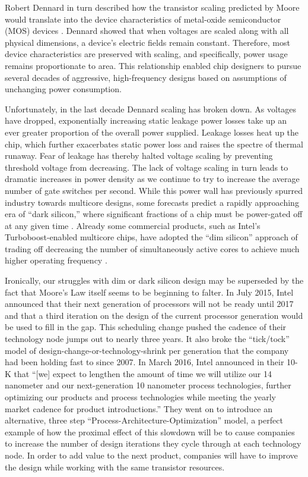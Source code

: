 Robert Dennard in turn described how the transistor scaling predicted by Moore would translate into the device characteristics of metal-oxide semiconductor (MOS) devices \cite{dennard1974design}.
Dennard showed that when voltages are scaled along with all physical dimensions, a device's electric fields remain constant.
Therefore, most device characteristics are preserved with scaling, and specifically, power usage remains proportionate to area.
This relationship enabled chip designers to pursue several decades of aggressive, high-frequency designs based on assumptions of unchanging power consumption.

Unfortunately, in the last decade Dennard scaling has broken down.
As voltages have dropped, exponentially increasing static leakage power losses take up an ever greater proportion of the overall power supplied.
Leakage losses heat up the chip, which further exacerbates static power loss and raises the spectre of thermal runaway.
Fear of leakage has thereby halted voltage scaling by preventing threshold voltage from decreasing.
The lack of voltage scaling in turn leads to dramatic increases in power density as we continue to try to increase the average number of gate switches per second. 
While this power wall has previously spurred industry towards multicore designs,
some forecasts predict a rapidly approaching era of ``dark silicon,'' where significant fractions of a chip must be power-gated off at any given time \cite{esmaeilzadeh2011dark}.
Already some commercial products, such as Intel's Turboboost-enabled multicore chips, have adopted the ``dim silicon'' approach of trading off decreasing the number of simultaneously active cores to achieve much higher operating frequency \cite{wang2013implications}.

Ironically, our struggles with dim or dark silicon design may be superseded by the fact that Moore's Law itself seems to be beginning to falter.
In July 2015, Intel announced that their next generation of processors will not be ready until 2017
and that a third iteration on the design of the current processor generation would be used to fill in the gap.
This scheduling change pushed the cadence of their technology node jumps out to nearly three years.
It also broke the ``tick/tock'' model of design-change-or-technology-shrink per generation that the company had been holding fast to since 2007.
In March 2016, Intel announced in their 10-K that ``[we] expect to lengthen the amount of time we will utilize our 14 nanometer and our next-generation 10 nanometer process technologies, further optimizing our products and process technologies while meeting the yearly market cadence for product introductions.''
They went on to introduce an alternative, three step ``Process-Architecture-Optimization'' model,
a perfect example of how the proximal effect of this slowdown will be to cause companies to increase the number of design iterations they cycle through at each technology node.
In order to add value to the next product, companies will have to improve the design while working with the same transistor resources.


